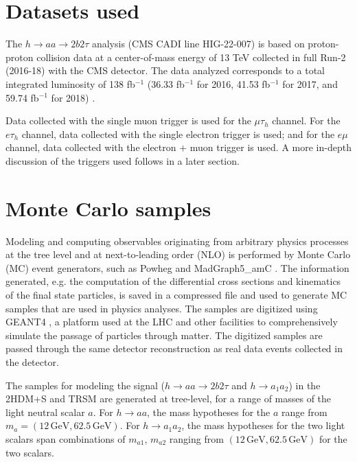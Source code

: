 \section{Datasets used}
The $h \rightarrow aa \rightarrow 2b2\tau$ analysis (CMS CADI line HIG-22-007) is based on proton-proton collision data at a center-of-mass energy of 13 TeV collected in full Run-2 (2016-18) with the CMS detector. The data analyzed corresponds to a total integrated luminosity of 138 fb$^{-1}$ (36.33 fb$^{-1}$ for 2016, 41.53 fb$^{-1}$ for 2017, and 59.74 fb$^{-1}$ for 2018) \cite{CMS-LUM-17-001} \cite{CMS-LUM-17-004} \cite{CMS-LUM-18-002}. 

Data collected with the single muon trigger is used for the $\mu\tau_{h}$ channel. For the $e\tau_{h}$ channel, data collected with the single electron trigger is used; and for the $e\mu$ channel, data collected with the electron $+$ muon trigger is used. A more in-depth discussion of the triggers used follows in a later section.


\section{Monte Carlo samples}
Modeling and computing observables originating from arbitrary physics processes at the tree level and at next-to-leading order (NLO) is performed by Monte Carlo (MC) event generators, such as Powheg and MadGraph5\_amC\@NLO \cite{Alwall_2014} \cite{Frederix_2018}. The information generated, e.g. the computation of the differential cross sections and kinematics of the final state particles, is saved in a compressed file and used to generate MC samples that are used in physics analyses. The samples are digitized using GEANT4 \cite{agostinelli_geant4simulation_2003}, a platform used at the LHC and other facilities to comprehensively simulate the passage of particles through matter. The digitized samples are passed through the same detector reconstruction as real data events collected in the detector.

The samples for modeling the signal ($h \rightarrow aa \rightarrow 2b2\tau$ and $h\rightarrow a_1 a_2$) in the 2HDM+S and TRSM are generated at tree-level, for a range of masses of the light neutral scalar $a$. For $h \rightarrow aa$, the mass hypotheses for the $a$ range from $m_a = (12 \,\text{GeV}, 62.5 \,\text{GeV})$. For $h \rightarrow a_1 a_2$, the mass hypotheses for the two light scalars span combinations of $m_{a1}$, $m_{a2}$ ranging from $(12 \,\text{GeV}, 62.5 \,\text{GeV})$ for the two scalars.

